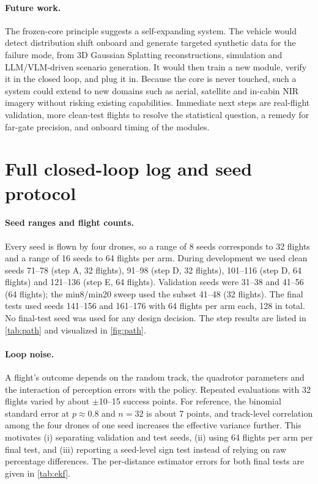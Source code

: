 \documentclass[10pt,twocolumn,letterpaper]{article}
\begin{document}
\paragraph{Future work.}
The frozen-core principle suggests a self-expanding system. The vehicle would detect distribution shift onboard and generate targeted synthetic data for the failure mode, from 3D Gaussian Splatting reconstructions, simulation and LLM/VLM-driven scenario generation. It would then train a new module, verify it in the closed loop, and plug it in. Because the core is never touched, such a system could extend to new domains such as aerial, satellite and in-cabin NIR imagery without risking existing capabilities. Immediate next steps are real-flight validation, more clean-test flights to resolve the statistical question, a remedy for far-gate precision, and onboard timing of the modules.

{
    \small
    
    
}

\clearpage
\appendix
\section{Full closed-loop log and seed protocol}
\label{sec:app_log}
\paragraph{Seed ranges and flight counts.}
Every seed is flown by four drones, so a range of 8 seeds corresponds to 32 flights and a range of 16 seeds to 64 flights per arm. During development we used clean seeds 71--78 (step A, 32 flights), 91--98 (step D, 32 flights), 101--116 (step D, 64 flights) and 121--136 (step E, 64 flights). Validation seeds were 31--38 and 41--56 (64 flights); the min8/min20 sweep used the subset 41--48 (32 flights). The final tests used seeds 141--156 and 161--176 with 64 flights per arm each, 128 in total. No final-test seed was used for any design decision. The step results are listed in \cref{tab:path} and visualized in \cref{fig:path}.

\paragraph{Loop noise.}
A flight's outcome depends on the random track, the quadrotor parameters and the interaction of perception errors with the policy. Repeated evaluations with 32 flights varied by about $\pm$10--15 success points. For reference, the binomial standard error at $p\approx0.8$ and $n=32$ is about 7 points, and track-level correlation among the four drones of one seed increases the effective variance further. This motivates (i) separating validation and test seeds, (ii) using 64 flights per arm per final test, and (iii) reporting a seed-level sign test instead of relying on raw percentage differences. The per-distance estimator errors for both final tests are given in \cref{tab:ekf}.
\end{document}
